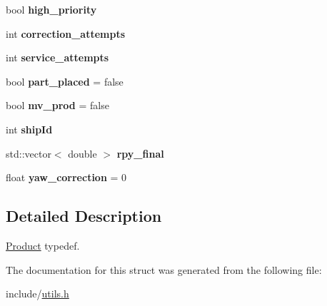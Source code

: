 \begin{DoxyCompactItemize}
bool {\bfseries high\+\_\+priority}
\item 
\mbox{\label{structProduct_a81bc7bfb8798574d9b5f58dec68257e2}} 
int {\bfseries correction\+\_\+attempts}
\item 
\mbox{\label{structProduct_abc4891099fad3ed0adc35ef02b5ef8be}} 
int {\bfseries service\+\_\+attempts}
\item 
\mbox{\label{structProduct_a000b24f81adac8808f6bcbf02e68791f}} 
bool {\bfseries part\+\_\+placed} = false
\item 
\mbox{\label{structProduct_a1a7bbf0dd07b412bce6eb12c3bb500ee}} 
bool {\bfseries mv\+\_\+prod} = false
\item 
\mbox{\label{structProduct_ae71dbd5781e7654476a95875105d6e58}} 
int {\bfseries ship\+Id}
\item 
\mbox{\label{structProduct_ade9eb069023303693749ca8dd75c83a5}} 
std\+::vector$<$ double $>$ {\bfseries rpy\+\_\+final}
\item 
\mbox{\label{structProduct_a2c245c65b7ee1dfbd23dcd3fcbe3e384}} 
float {\bfseries yaw\+\_\+correction} = 0
\end{DoxyCompactItemize}


\subsection{Detailed Description}
\hyperlink{structProduct}{Product} typedef. 

The documentation for this struct was generated from the following file\+:\begin{DoxyCompactItemize}
\item 
include/\hyperlink{utils_8h}{utils.\+h}\end{DoxyCompactItemize}
